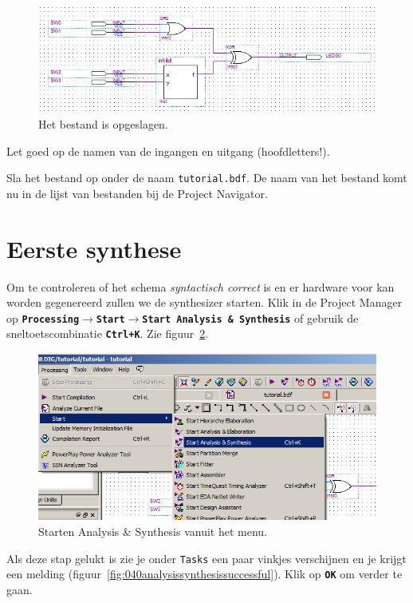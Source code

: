\documentclass[a4paper,12pt,fleqn,twoside]{book}
\def\tutpicscale{0.455}
\newcommand{\menu}[1]{\texttt{\textbf{#1}}}
\newcommand{\knop}[1]{\texttt{\textbf{#1}}}
\newcommand{\naam}[1]{\texttt{#1}}
\def\pijl{$\rightarrow$}%
\begin{document}
\begin{figure}[H]
\centering
\includegraphics[scale=\tutpicscale]{038schematictoplevel}
\caption{Het bestand is opgeslagen.}
\label{fig:038schematictoplevel}
\end{figure}

Let goed op de namen van de ingangen en uitgang (hoofdletters!). 
 
Sla het bestand op onder de naam \naam{tutorial.bdf}. De naam van het bestand
komt nu in de lijst van bestanden bij de Project Navigator.


\section{Eerste synthese}
\label{sec:eerstesynthese}
Om te controleren of het schema \textsl{syntactisch correct} is en er hardware
voor kan worden gegenereerd zullen we de synthesizer starten. Klik in de Project
Manager op \menu{Processing\pijl{}Start\pijl{}Start Analysis \& Synthesis} of
gebruik de sneltoetscombinatie \menu{Ctrl+K}. Zie
figuur~\ref{fig:039startanalysis}.
 
\begin{figure}[H]
\centering
\includegraphics[scale=\tutpicscale]{039startanalysis}
\caption{Starten Analysis \& Synthesis vanuit het menu.}
\label{fig:039startanalysis}
\end{figure}

Als deze stap gelukt is zie je onder \naam{Tasks} een paar vinkjes verschijnen
en je krijgt een melding (figuur~\ref{fig:040analysissynthesissuccessful}).
Klik op \knop{OK} om verder te gaan.
 
\end{document}
